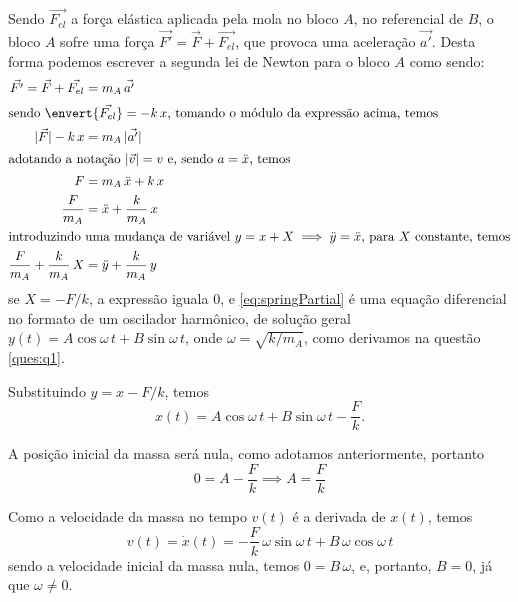 \documentclass[]{IMTexam}
\begin{document}
\begin{questions}
\begin{solution}
\begin{multi}
		\end{multi}

		\medskip

		Sendo $\vec{F_{el}}$ a força elástica aplicada pela mola no bloco $ A $, no referencial de $ B $, o bloco $ A $ sofre uma força $ \vec{F'}=\vec{F}+\vec{F_{el}} $, que provoca uma aceleração $ \vec{a'} $. Desta forma podemos escrever a segunda lei de Newton para o bloco $ A $ como sendo:
		\begin{align}
			\vec{F'}=\vec{F}+\vec{F_{el}}    & =m_A\,\vec{a'}\nonumber                             \\
			\intertext{sendo $ \envert{\vec{F_{el}}}=-k\,x $, tomando o módulo da expressão acima, temos}
			|\vec{F}|-k\,x                   & =m_A\,|\vec{a'}|\nonumber                           \\
			\intertext{adotando a notação $ |\vec{v}|=v $ e, sendo $ a=\ddot{x} $, temos}
			F                                & =m_A\,\ddot{x}+k\,x\nonumber                        \\
			\dfrac{F}{m_A}                   & =\ddot{x}+\dfrac{k}{m_A}\,x\nonumber                \\
			\intertext{introduzindo uma mudança de variável $ y=x+X\implies \ddot{y}=\ddot{x} $, para $ X $ constante, temos}
			\dfrac{F}{m_A}+\dfrac{k}{m_A}\,X & =\ddot{y}+\dfrac{k}{m_A}\,y\label{eq:springPartial}
		\end{align}
		se $ X=-F/k $, a expressão iguala $ 0 $, e \ref{eq:springPartial} é uma equação diferencial no formato de um oscilador harmônico, de solução geral $ y(t)=A\cos\omega\,t+B\sin\omega\,t $, onde $ \omega=\sqrt{k/m_A} $, como derivamos na questão \ref{ques:q1}.

		Substituindo $ y=x-F/k $, temos
		\[ x(t)=A\cos\omega\,t+B\sin\omega\,t-\dfrac{F}{k}. \]

		A posição inicial da massa será nula, como adotamos anteriormente, portanto
		\[ 0=A-\dfrac{F}{k}\implies A=\dfrac{F}{k} \]

		Como a velocidade da massa no tempo $ v(t) $ é a derivada de $ x(t) $, temos
		\[ v(t)=\dot{x}(t)=-\dfrac{F}{k}\,\omega\sin\omega\,t+B\,\omega\cos\omega\,t \]
		sendo a velocidade inicial da massa nula, temos $ 0=B\,\omega $, e, portanto, $ B=0 $, já que $ \omega\neq 0 $.


\end{solution}
\end{questions}
\end{document}
